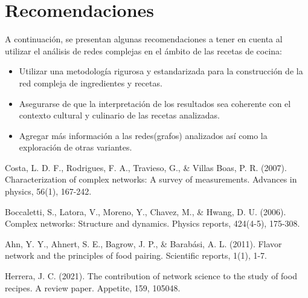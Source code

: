 \documentclass[a4paper]{article}
\begin{document}
\section{Recomendaciones}\label{sec:rec}

A continuación, se presentan algunas recomendaciones a tener en cuenta al
utilizar el análisis de redes complejas en el ámbito de las recetas de cocina:
\begin{itemize}
	\item Utilizar una metodología rigurosa y estandarizada para la construcción
	de la red compleja de ingredientes y recetas.
	\item Asegurarse de que la interpretación de los resultados sea coherente
	con el contexto cultural y culinario de las recetas analizadas.
	\item Agregar más información a las redes(grafos) analizados así como la
	exploración de otras variantes.
\end{itemize}




\begin{thebibliography}{99}
	 Costa, L. D. F., Rodrigues, F. A., Travieso, G., \& Villas Boas, P. R. (2007). Characterization of complex networks: A survey of measurements. Advances in physics, 56(1), 167-242.

	 Boccaletti, S., Latora, V., Moreno, Y., Chavez, M., \& Hwang, D. U. (2006). Complex networks: Structure and dynamics. Physics reports, 424(4-5), 175-308.

	 Ahn, Y. Y., Ahnert, S. E., Bagrow, J. P., & Barabási, A. L. (2011). Flavor network and the principles of food pairing. Scientific reports, 1(1), 1-7.

	 Herrera, J. C. (2021). The contribution of network science to the study of food recipes. A review paper. Appetite, 159, 105048.

\end{thebibliography}


\label{end}
\end{document}
